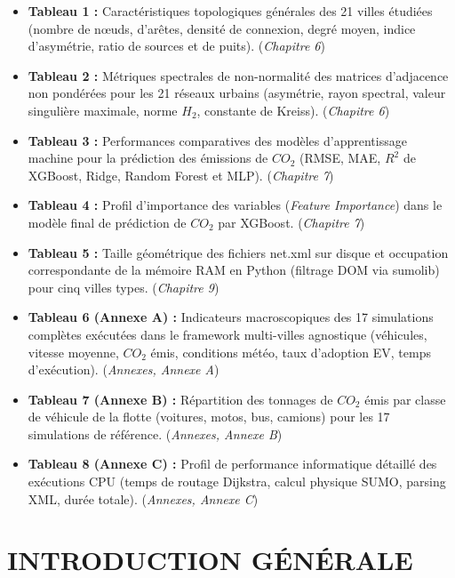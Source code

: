 \documentclass[10pt, a4paper]{article}
\providecommand{\tightlist}{}
\begin{document}
\begin{itemize}
\tightlist
\item
  \textbf{Tableau 1 :} Caractéristiques topologiques générales des 21
  villes étudiées (nombre de nœuds, d'arêtes, densité de connexion,
  degré moyen, indice d'asymétrie, ratio de sources et de puits).
  (\emph{Chapitre 6})
\item
  \textbf{Tableau 2 :} Métriques spectrales de non-normalité des
  matrices d'adjacence non pondérées pour les 21 réseaux urbains
  (asymétrie, rayon spectral, valeur singulière maximale, norme \(H_2\),
  constante de Kreiss). (\emph{Chapitre 6})
\item
  \textbf{Tableau 3 :} Performances comparatives des modèles
  d'apprentissage machine pour la prédiction des émissions de \(CO_2\)
  (RMSE, MAE, \(R^2\) de XGBoost, Ridge, Random Forest et MLP).
  (\emph{Chapitre 7})
\item
  \textbf{Tableau 4 :} Profil d'importance des variables (\emph{Feature
  Importance}) dans le modèle final de prédiction de \(CO_2\) par
  XGBoost. (\emph{Chapitre 7})
\item
  \textbf{Tableau 5 :} Taille géométrique des fichiers net.xml sur
  disque et occupation correspondante de la mémoire RAM en Python
  (filtrage DOM via sumolib) pour cinq villes types. (\emph{Chapitre 9})
\item
  \textbf{Tableau 6 (Annexe A) :} Indicateurs macroscopiques des 17
  simulations complètes exécutées dans le framework multi-villes
  agnostique (véhicules, vitesse moyenne, \(CO_2\) émis, conditions
  météo, taux d'adoption EV, temps d'exécution). (\emph{Annexes, Annexe
  A})
\item
  \textbf{Tableau 7 (Annexe B) :} Répartition des tonnages de \(CO_2\)
  émis par classe de véhicule de la flotte (voitures, motos, bus,
  camions) pour les 17 simulations de référence. (\emph{Annexes, Annexe
  B})
\item
  \textbf{Tableau 8 (Annexe C) :} Profil de performance informatique
  détaillé des exécutions CPU (temps de routage Dijkstra, calcul
  physique SUMO, parsing XML, durée totale). (\emph{Annexes, Annexe C})
\end{itemize}

\newpage

\section{INTRODUCTION GÉNÉRALE}\label{introduction-guxe9nuxe9rale}
\end{document}

